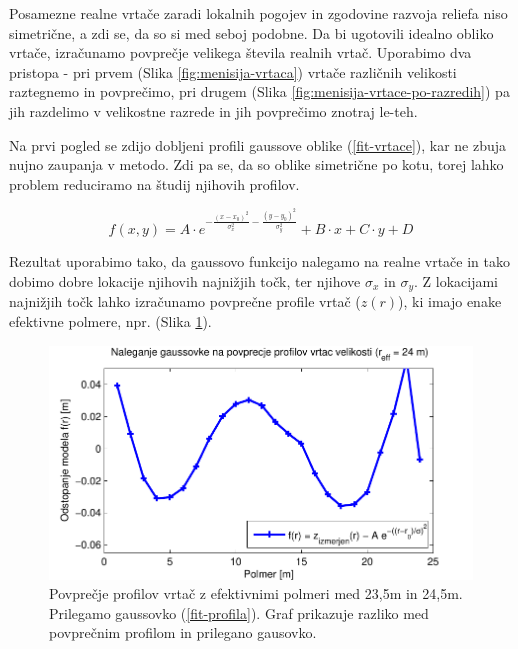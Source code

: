\documentclass[a4paper, twoside, 12pt]{book}
\begin{document}
        Posamezne realne vrtače zaradi lokalnih pogojev in zgodovine razvoja reliefa niso simetrične, a zdi se, da so si med seboj podobne. Da bi ugotovili idealno obliko vrtače, izračunamo povprečje velikega števila realnih vrtač. Uporabimo dva pristopa - pri prvem (Slika \ref{fig:menisija-vrtaca}) vrtače različnih velikosti raztegnemo in povprečimo, pri drugem (Slika \ref{fig:menisija-vrtace-po-razredih}) pa jih razdelimo v velikostne razrede in jih povprečimo znotraj le-teh. 

        Na prvi pogled se zdijo dobljeni profili gaussove oblike (\ref{fit-vrtace}), kar ne zbuja nujno zaupanja v metodo. Zdi pa se, da so oblike simetrične po kotu, torej lahko problem reduciramo na študij njihovih profilov. 

        \begin{equation}
          f(x,y) = A \cdot e^{-\frac{(x-x_0)^2}{\sigma_x^2}-\frac{(y-y_0)^2}{\sigma_y^2}} + B \cdot x + C \cdot y + D  
          \label{fit-vrtace}
        \end{equation}

        Rezultat uporabimo tako, da gaussovo funkcijo nalegamo na realne vrtače in tako dobimo dobre lokacije njihovih najnižjih točk, ter njihove $\sigma_x$ in $\sigma_y$. Z lokacijami najnižjih točk lahko izračunamo povprečne profile vrtač ($z(r)$), ki imajo enake efektivne polmere, npr. (Slika \ref{fig:menisija-profil-21-fit}).

        \begin{figure}[h!]
          \begin{center}
            \includegraphics[width=12cm]{slike/menisija-profil-21-fit}
          \end{center}
          \caption{Povprečje profilov vrtač z efektivnimi polmeri med 23,5m in 24,5m. Prilegamo gaussovko (\ref{fit-profila}). Graf prikazuje razliko med povprečnim profilom in prilegano gausovko.}
          \label{fig:menisija-profil-21-fit}
        \end{figure}
\end{document}
